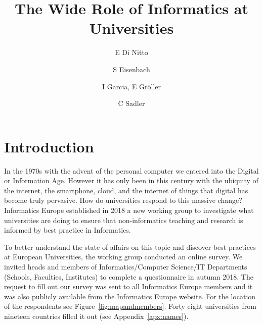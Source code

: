 \documentclass[11pt]{amsart}
\title{The Wide Role of Informatics at Universities}
\author{E Di Nitto \and S Eisenbach \and I Garcia, E Gr\"{o}ller \and C Sadler}
\begin{document}

\maketitle
\section{Introduction}

In the 1970s with the advent of the personal computer we entered into the Digital or Information Age. However it has only been in this century with the ubiquity of the internet, the smartphone, cloud, and the internet of things that digital has become truly pervasive. How do universities respond to this massive change? Informatics Europe established in 2018 a new working group to investigate what universities are doing to ensure that non-informatics teaching and research is informed by best practice in Informatics.

To better understand the state of affairs on this topic and discover best practices at European Universities, the working group conducted an online survey. We invited heads and members of Informatics/Computer Science/IT Departments (Schools, Faculties, Institutes) to complete a questionnaire in autumn 2018. The request to fill out our survey was sent to all Informatics Europe members and it was also publicly available from the Informatics Europe website.  For the location of the respondents see Figure~\ref{fig:mapandmembers}.  Forty eight universities from nineteen countries filled it out (see Appendix~\ref{apx:names}).
\end{document}
